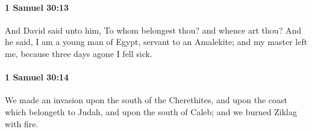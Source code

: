 		\paragraph{1 Samuel 30:13} %
			\label{1SAMUEL-30-13}

			And David said unto him, To whom belongest thou? and whence art thou? And he said, I am a young man of Egypt, servant to an Amalekite; and my master left me, because three days agone I fell sick.


		\paragraph{1 Samuel 30:14} %
			\label{1SAMUEL-30-14}

			We made an invasion upon the south of the Cherethites, and upon the coast which belongeth to Judah, and upon the south of Caleb; and we burned Ziklag with fire.


